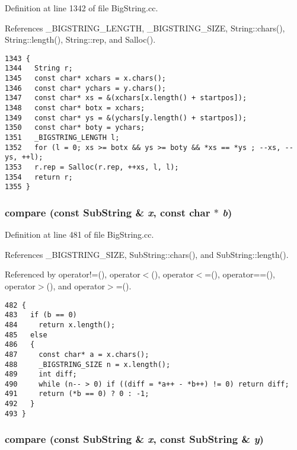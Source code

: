 Definition at line 1342 of file Big\-String.cc.

References \_\-BIGSTRING\_\-LENGTH, \_\-BIGSTRING\_\-SIZE, String::chars(), String::length(), String::rep, and Salloc().



\footnotesize\begin{verbatim}1343 {
1344   String r;
1345   const char* xchars = x.chars();
1346   const char* ychars = y.chars();
1347   const char* xs = &(xchars[x.length() + startpos]);
1348   const char* botx = xchars;
1349   const char* ys = &(ychars[y.length() + startpos]);
1350   const char* boty = ychars;
1351   _BIGSTRING_LENGTH l;
1352   for (l = 0; xs >= botx && ys >= boty && *xs == *ys ; --xs, --ys, ++l);
1353   r.rep = Salloc(r.rep, ++xs, l, l);
1354   return r;
1355 }
\end{verbatim}\normalsize 
{}
\subsubsection{ compare (const {\bf Sub\-String} \& {\em x}, const char $\ast$ {\em b})}\label{BigString_8cc_a30}




Definition at line 481 of file Big\-String.cc.

References \_\-BIGSTRING\_\-SIZE, Sub\-String::chars(), and Sub\-String::length().

Referenced by operator!=(), operator$<$(), operator$<$=(), operator==(), operator$>$(), and operator$>$=().



\footnotesize\begin{verbatim}482 {
483   if (b == 0)
484     return x.length();
485   else
486   {
487     const char* a = x.chars();
488     _BIGSTRING_SIZE n = x.length();
489     int diff;
490     while (n-- > 0) if ((diff = *a++ - *b++) != 0) return diff;
491     return (*b == 0) ? 0 : -1;
492   }
493 }
\end{verbatim}\normalsize 
{}
\subsubsection{ compare (const {\bf Sub\-String} \& {\em x}, const {\bf Sub\-String} \& {\em y})}\label{BigString_8cc_a29}





